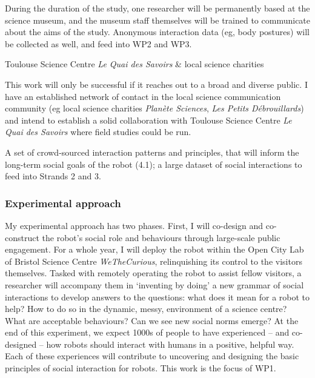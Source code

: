 During the duration of the study, one researcher will be permanently based at
the science museum, and the museum staff themselves will be trained to
communicate about the aims of the study. Anonymous interaction data (eg, body
postures) will be collected as well, and feed into WP2 and WP3.

\begin{collaboration}{Toulouse Science Centre \emph{Le Quai des Savoirs}
    \newline \& local science charities}

    This work will only be successful if it reaches out to a broad and diverse
    public. I have an established network of contact in the local science
    communication community (eg local science charities \emph{Planète Sciences},
    \emph{Les Petits Débrouillards}) and intend to establish a solid
    collaboration with Toulouse Science Centre \emph{Le Quai des Savoirs} where
    field studies could be run.
    
\end{collaboration}

\begin{outcome}{5.1}
A set of crowd-sourced interaction
    patterns and principles, that will inform the long-term social goals of the
    robot (4.1); a large dataset of social interactions to feed into Strands 2
    and 3.
\end{outcome}


\subsubsection{Experimental approach}

My experimental approach has two phases. First, I will co-design and
co-construct the robot's social role and behaviours through large-scale public
engagement. For a whole year, I will deploy the \project robot within the Open
City Lab of Bristol Science Centre \emph{WeTheCurious}, relinquishing its
control to the visitors themselves. Tasked with remotely operating the robot to
assist fellow visitors, a researcher will accompany them in `inventing by doing' a new
grammar of social interactions to develop answers to the questions: what does it
mean for a robot to help? How to do so in the dynamic, messy, environment of a
science centre? What are acceptable behaviours? Can we see new social norms
emerge? At the end of this experiment, we expect 1000s of people to have
experienced -- and co-designed -- how robots should interact with humans in a
positive, helpful way. Each of these experiences will contribute to
uncovering and designing the basic principles of social interaction for robots.
This work is the focus of WP1.

